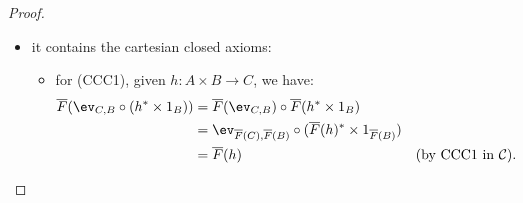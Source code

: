 \begin{proof}
\begin{itemize}
\begin{itemize}[label=$\ast$]
            \item for (CC2a), given $f : C \to A$, $g : C \to B$, we have:
            \begin{align*}
                \overline F(\pi_{A,B} \circ \langle f,g\rangle) &= \overline F(\pi_{A,B}) \circ \overline F(\langle f,g\rangle) &&(\textnormal{by functoriality}) \\
                &= \pi_{\overline F(A),\overline F(B)} \circ \langle \overline F(f), \overline F(g)\rangle &&(\textnormal{by cartesian closedness}) \\
                &= \overline F(f) &&(\textnormal{by CC2a in $\mathcal C$});
            \end{align*}
            \item similarly for (CC2b);
            \item for (CC2c), given $h : C \to A \times B$, we have:
            \begin{align*}
                \overline F(\langle \pi_{A,B} \circ h, \pi_{A,B}' \circ h\rangle) &= \langle \overline F(\pi_{A,B}) \circ \overline F(h), \overline F(\pi_{A,B}') \circ \overline F(h)\rangle \\
                                                                                  &= \langle \pi_{\overline F(A),\overline F(B)} \circ \overline F(h), \pi_{\overline F(A),\overline F(B)}' \circ \overline F(h)\rangle \\
                                                                                  &= \overline F(h) &&(\textnormal{by CC2c in $\mathcal C$});
            \end{align*}
        \end{itemize}
        \item it contains the cartesian closed axioms:
        \begin{itemize}[label=$\ast$]
            \item for (CCC1), given $h : A \times B \to C$, we have:
            \begin{align*}
                \overline F(\ev_{C,B} \circ (h^* \times 1_B)) &= \overline F(\ev_{C,B}) \circ \overline F(h^* \times 1_B) \\
                                                              &= \ev_{\overline F(C),\overline F(B)} \circ (\overline F(h)^* \times 1_{\overline F(B)}) \\
                                                              &= \overline F(h) &&(\textnormal{by CCC1 in $\mathcal C$}).
            \end{align*}

\end{itemize}
\end{itemize}
\end{proof}
